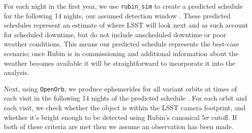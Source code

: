 \documentclass[twocolumn]{aastex631}
\begin{document}

For each night in the first year, we use \texttt{rubin\_sim} to create a predicted schedule for the following 14 nights, our assumed detection window \citep{rubin_sim}. These predicted schedules represent an estimate of where LSST will look next and as such account for scheduled downtime, but do not include unscheduled downtime or poor weather conditions. This means our predicted schedule represents the best-case scenario; once Rubin is in commissioning and additional information about the weather becomes available it will be straightforward to incorporate it into the analysis.

Next, using \texttt{OpenOrb}, we produce ephemerides for all variant orbits at times of each visit in the following 14 nights of the predicted schedule \citep{Granvik+2009}. For each orbit and each visit, we check whether the object is within the LSST camera footprint, and whether it's bright enough to be detected using Rubin's canonical $5\sigma$ cutoff. If both of these criteria are met then we assume an observation has been made.
\end{document}
